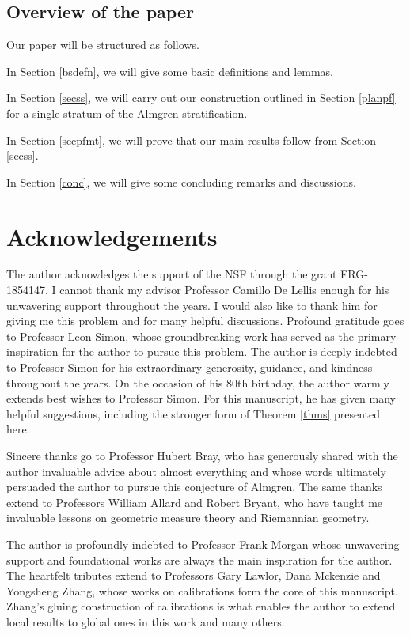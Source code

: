 \documentclass[11pt,a4paper]{amsart}
\numberwithin{equation}{section}
\theoremstyle{plain}
\theoremstyle{definition}
\numberwithin{equation}{subsection}
\begin{document}
	\subsection{Overview of the paper}
	Our paper will be structured as follows. 

	In Section \ref{bsdefn}, we will give some basic definitions and lemmas. 
	
In Section \ref{secss}, we will carry out our construction outlined in Section \ref{planpf} for a single stratum of the Almgren stratification.

In Section \ref{secpfmt}, we will prove that our main results follow from Section \ref{secss}.

	
	In Section \ref{conc}, we will give some concluding remarks and discussions.
	\section*{Acknowledgements}
	The author acknowledges the support
of the NSF through the grant FRG-1854147.
I cannot thank my advisor Professor Camillo De Lellis enough for his unwavering support throughout the years. I would also like to thank him for giving me this problem and for many helpful discussions. Profound gratitude goes to Professor Leon Simon, whose groundbreaking work \cite{LS} has served as the primary inspiration for the author to pursue this problem. The author is deeply indebted to Professor Simon for his extraordinary generosity, guidance, and kindness throughout the years. On the occasion of his 80th birthday, the author warmly extends best wishes to Professor Simon.  For this manuscript, he has given many helpful suggestions, including the stronger form of Theorem \ref{thms} presented here. 

Sincere thanks go to Professor Hubert Bray, who has generously shared with the author invaluable advice about almost everything and whose words ultimately persuaded the author to pursue this conjecture of Almgren. The same thanks extend to Professors William Allard and Robert Bryant, who have taught me invaluable lessons on geometric measure theory and Riemannian geometry.  

The author is profoundly indebted to Professor Frank Morgan whose unwavering support and foundational works are always the main inspiration for the author. The heartfelt tributes extend to Professors Gary Lawlor, Dana Mckenzie and Yongsheng Zhang, whose works on calibrations form the core of this manuscript. Zhang's gluing construction of calibrations \cite{YZa,YZj} is what enables the author to extend local results to global ones in this work and many others.
\end{document}
